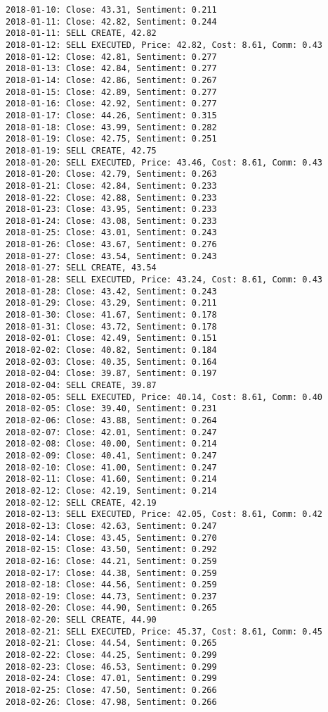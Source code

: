 \documentclass[11pt]{article}
\begin{document}
\begin{Verbatim}[commandchars=\\\{\}]
2018-01-10: Close: 43.31, Sentiment: 0.211
2018-01-11: Close: 42.82, Sentiment: 0.244
2018-01-11: SELL CREATE, 42.82
2018-01-12: SELL EXECUTED, Price: 42.82, Cost: 8.61, Comm: 0.43
2018-01-12: Close: 42.81, Sentiment: 0.277
2018-01-13: Close: 42.84, Sentiment: 0.277
2018-01-14: Close: 42.86, Sentiment: 0.267
2018-01-15: Close: 42.89, Sentiment: 0.277
2018-01-16: Close: 42.92, Sentiment: 0.277
2018-01-17: Close: 44.26, Sentiment: 0.315
2018-01-18: Close: 43.99, Sentiment: 0.282
2018-01-19: Close: 42.75, Sentiment: 0.251
2018-01-19: SELL CREATE, 42.75
2018-01-20: SELL EXECUTED, Price: 43.46, Cost: 8.61, Comm: 0.43
2018-01-20: Close: 42.79, Sentiment: 0.263
2018-01-21: Close: 42.84, Sentiment: 0.233
2018-01-22: Close: 42.88, Sentiment: 0.233
2018-01-23: Close: 43.95, Sentiment: 0.233
2018-01-24: Close: 43.08, Sentiment: 0.233
2018-01-25: Close: 43.01, Sentiment: 0.243
2018-01-26: Close: 43.67, Sentiment: 0.276
2018-01-27: Close: 43.54, Sentiment: 0.243
2018-01-27: SELL CREATE, 43.54
2018-01-28: SELL EXECUTED, Price: 43.24, Cost: 8.61, Comm: 0.43
2018-01-28: Close: 43.42, Sentiment: 0.243
2018-01-29: Close: 43.29, Sentiment: 0.211
2018-01-30: Close: 41.67, Sentiment: 0.178
2018-01-31: Close: 43.72, Sentiment: 0.178
2018-02-01: Close: 42.49, Sentiment: 0.151
2018-02-02: Close: 40.82, Sentiment: 0.184
2018-02-03: Close: 40.35, Sentiment: 0.164
2018-02-04: Close: 39.87, Sentiment: 0.197
2018-02-04: SELL CREATE, 39.87
2018-02-05: SELL EXECUTED, Price: 40.14, Cost: 8.61, Comm: 0.40
2018-02-05: Close: 39.40, Sentiment: 0.231
2018-02-06: Close: 43.88, Sentiment: 0.264
2018-02-07: Close: 42.01, Sentiment: 0.247
2018-02-08: Close: 40.00, Sentiment: 0.214
2018-02-09: Close: 40.41, Sentiment: 0.247
2018-02-10: Close: 41.00, Sentiment: 0.247
2018-02-11: Close: 41.60, Sentiment: 0.214
2018-02-12: Close: 42.19, Sentiment: 0.214
2018-02-12: SELL CREATE, 42.19
2018-02-13: SELL EXECUTED, Price: 42.05, Cost: 8.61, Comm: 0.42
2018-02-13: Close: 42.63, Sentiment: 0.247
2018-02-14: Close: 43.45, Sentiment: 0.270
2018-02-15: Close: 43.50, Sentiment: 0.292
2018-02-16: Close: 44.21, Sentiment: 0.259
2018-02-17: Close: 44.38, Sentiment: 0.259
2018-02-18: Close: 44.56, Sentiment: 0.259
2018-02-19: Close: 44.73, Sentiment: 0.237
2018-02-20: Close: 44.90, Sentiment: 0.265
2018-02-20: SELL CREATE, 44.90
2018-02-21: SELL EXECUTED, Price: 45.37, Cost: 8.61, Comm: 0.45
2018-02-21: Close: 44.54, Sentiment: 0.265
2018-02-22: Close: 44.25, Sentiment: 0.299
2018-02-23: Close: 46.53, Sentiment: 0.299
2018-02-24: Close: 47.01, Sentiment: 0.299
2018-02-25: Close: 47.50, Sentiment: 0.266
2018-02-26: Close: 47.98, Sentiment: 0.266

\end{Verbatim}
\end{document}
